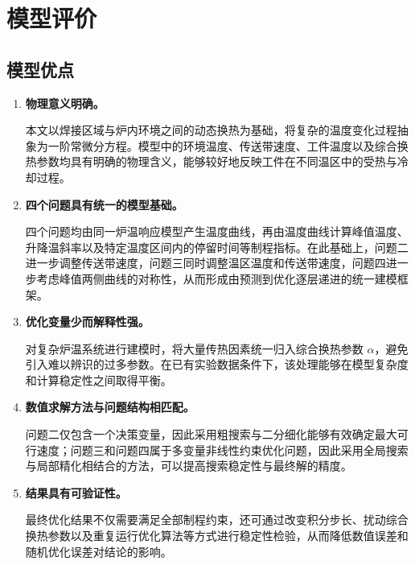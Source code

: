 \documentclass{cumcmthesis}
\begin{document}

\section{模型评价}

\subsection{模型优点}

\begin{enumerate}
    \item \textbf{物理意义明确。}
    
    本文以焊接区域与炉内环境之间的动态换热为基础，将复杂的温度变化过程抽象为一阶常微分方程。模型中的环境温度、传送带速度、工件温度以及综合换热参数均具有明确的物理含义，能够较好地反映工件在不同温区中的受热与冷却过程。

    \item \textbf{四个问题具有统一的模型基础。}
    
    四个问题均由同一炉温响应模型产生温度曲线，再由温度曲线计算峰值温度、升降温斜率以及特定温度区间内的停留时间等制程指标。在此基础上，问题二进一步调整传送带速度，问题三同时调整温区温度和传送带速度，问题四进一步考虑峰值两侧曲线的对称性，从而形成由预测到优化逐层递进的统一建模框架。

    \item \textbf{优化变量少而解释性强。}
    
    对复杂炉温系统进行建模时，将大量传热因素统一归入综合换热参数 $\alpha$，避免引入难以辨识的过多参数。在已有实验数据条件下，该处理能够在模型复杂度和计算稳定性之间取得平衡。

    \item \textbf{数值求解方法与问题结构相匹配。}
    
    问题二仅包含一个决策变量，因此采用粗搜索与二分细化能够有效确定最大可行速度；问题三和问题四属于多变量非线性约束优化问题，因此采用全局搜索与局部精化相结合的方法，可以提高搜索稳定性与最终解的精度。

    \item \textbf{结果具有可验证性。}
    
    最终优化结果不仅需要满足全部制程约束，还可通过改变积分步长、扰动综合换热参数以及重复运行优化算法等方式进行稳定性检验，从而降低数值误差和随机优化误差对结论的影响。
\end{enumerate}
\end{document}
